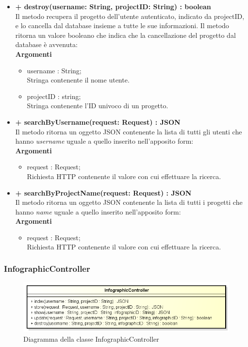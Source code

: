 \begin{itemize}
			\item \textbf{+ destroy(username: String, projectID: String) : boolean}\\
			Il metodo recupera il progetto dell'utente autenticato, indicato da projectID, e lo cancella dal database insieme a tutte le sue informazioni. Il metodo ritorna un valore booleano che indica che la cancellazione del progetto dal database è avvenuta:\\
			\textbf{Argomenti}
			\begin{itemize}
				\item username : String;\\
				Stringa contenente il nome utente.
				\item projectID : string; \\
				Stringa contenente l'ID univoco di un progetto.
			\end{itemize}
			
			\item \textbf{+ searchByUsername(request: Request) : JSON}\\
			Il metodo ritorna un oggetto JSON contenente la lista di tutti gli utenti che hanno \textit{username} uguale a quello inserito nell'apposito form:\\
			\textbf{Argomenti}
			\begin{itemize}
				\item request : Request;\\
				Richiesta HTTP contenente il valore con cui effettuare la ricerca.
			\end{itemize}
			
			\item \textbf{+ searchByProjectName(request: Request) : JSON}\\
			Il metodo ritorna un oggetto JSON contenente la lista di tutti i progetti che hanno \textit{name} uguale a quello inserito nell'apposito form:\\
			\textbf{Argomenti}
			\begin{itemize}
				\item request : Request;\\
				Richiesta HTTP contenente il valore con cui effettuare la ricerca.
			\end{itemize}
		\end{itemize}
		
\newpage
\subsubsection{InfographicController}
\begin{figure}[h]
\centering
\includegraphics[width=0.8\linewidth]{img/back_end_http_controllers_infographicController}
\caption[Diagramma della classe InfographicController]{Diagramma della classe InfographicController}
\label{fig:back_end_http_controllers_infographicController}
\end{figure}

